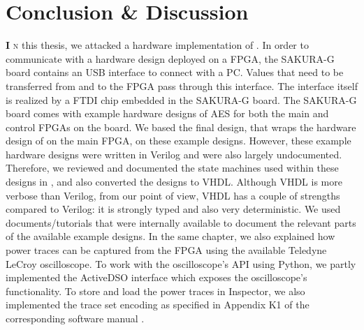 
\chapter{Conclusion \& Discussion} \label{chp: Conclusion and Discussion}
\lettrine[lhang = 0.4, findent=-30pt, lines=4]{\textbf{
		\initfamily \fontsize{20mm}{20mm} \selectfont I
		\normalfont}}{n}
this thesis, we attacked a hardware implementation of {\fourq}.
In order to communicate with a hardware design deployed on a FPGA, the SAKURA-G board contains an USB interface to connect with a PC.
Values that need to be transferred from and to the FPGA pass through this interface.
The interface itself is realized by a FTDI chip embedded in the SAKURA-G board.
The SAKURA-G board comes with example hardware designs of AES for both the main and control FPGAs on the board.
We based the final design, that wraps the hardware design of {\fourq} on the main FPGA, on these example designs.
However, these example hardware designs were written in Verilog and were also largely undocumented.
Therefore, we reviewed and documented the state machines used within these designs in , and also converted the designs to VHDL.
Although VHDL is more verbose than Verilog, from our point of view, VHDL has a couple of strengths compared to Verilog: it is strongly typed and also very deterministic.
We used documents/tutorials that were internally available to document the relevant parts of the available example designs.
In the same chapter, we also explained how power traces can be captured from the FPGA using the available Teledyne LeCroy oscilloscope.
To work with the oscilloscope's API using Python, we partly implemented the ActiveDSO interface which exposes the oscilloscope's functionality.
To store and load the power traces in Inspector, we also implemented the trace set encoding as specified in Appendix K1 of the corresponding software manual \cite{riscure2017inspector}.


